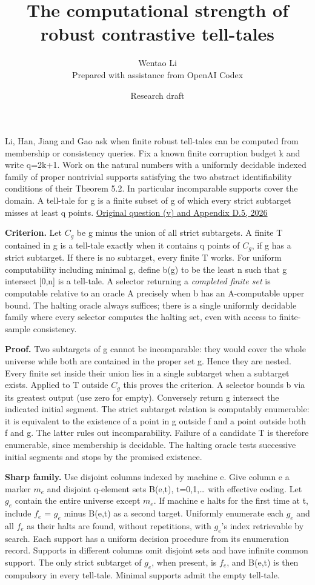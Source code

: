 \documentclass[11pt]{article}
\title{The computational strength of robust contrastive tell-tales}
\author{Wentao Li\\{\small Prepared with assistance from OpenAI Codex}}
\date{Research draft}
\begin{document}
\maketitle
Li, Han, Jiang and Gao ask when finite robust tell-tales can be computed from membership or consistency queries. Fix a known finite corruption budget k and write q=2k+1. Work on the natural numbers with a uniformly decidable indexed family of proper nontrivial supports satisfying the two abstract identifiability conditions of their Theorem 5.2. In particular incomparable supports cover the domain. A tell-tale for g is a finite subset of g of which every strict subtarget misses at least q points. \href{https://arxiv.org/abs/2605.06211v2}{Original question (v) and Appendix D.5, 2026}

\textbf{Criterion.} Let \(C_{g}\) be g minus the union of all strict subtargets. A finite T contained in g is a tell-tale exactly when it contains q points of \(C_{g}\), if g has a strict subtarget. If there is no subtarget, every finite T works. For uniform computability including minimal g, define b(g) to be the least n such that g intersect {[}0,n{]} is a tell-tale. A selector returning a \emph{completed finite set} is computable relative to an oracle A precisely when b has an A-computable upper bound. The halting oracle always suffices; there is a single uniformly decidable family where every selector computes the halting set, even with access to finite-sample consistency.

\textbf{Proof.} Two subtargets of g cannot be incomparable: they would cover the whole universe while both are contained in the proper set g. Hence they are nested. Every finite set inside their union lies in a single subtarget when a subtarget exists. Applied to T outside \(C_{g}\) this proves the criterion. A selector bounds b via its greatest output (use zero for empty). Conversely return g intersect the indicated initial segment. The strict subtarget relation is computably enumerable: it is equivalent to the existence of a point in g outside f and a point outside both f and g. The latter rules out incomparability. Failure of a candidate T is therefore enumerable, since membership is decidable. The halting oracle tests successive initial segments and stops by the promised existence.

\textbf{Sharp family.} Use disjoint columns indexed by machine e. Give column e a marker \(m_{e}\) and disjoint q-element sets B(e,t), t=0,1,\ldots{} with effective coding. Let \(g_{e}\) contain the entire universe except \(m_{e}\). If machine e halts for the first time at t, include \(f_{e}\) = \(g_{e}\) minus B(e,t) as a second target. Uniformly enumerate each \(g_{e}\) and all \(f_{e}\) as their halts are found, without repetitions, with \(g_{e}\)'s index retrievable by search. Each support has a uniform decision procedure from its enumeration record. Supports in different columns omit disjoint sets and have infinite common support. The only strict subtarget of \(g_{e}\), when present, is \(f_{e}\), and B(e,t) is then compulsory in every tell-tale. Minimal supports admit the empty tell-tale.
\end{document}
